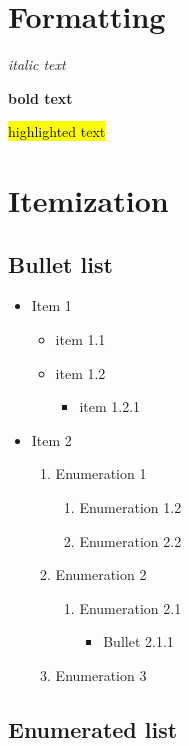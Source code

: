 \documentclass{doc_class_fontsize}{extarticle}
\begin{document}
\section{Formatting}




\textit{italic text}

\textbf{bold text}

\hl{highlighted text}





\section{Itemization}

\subsection{Bullet list}

\begin{itemize}
\item Item 1
\begin{itemize}
\item item 1.1
\item item 1.2
\begin{itemize}
\item item 1.2.1
\end{itemize}
\end{itemize}
\item Item 2
\begin{enumerate}
\item Enumeration 1
\begin{enumerate}
\item Enumeration 1.2
\item Enumeration 2.2
\end{enumerate}
\item Enumeration 2
\begin{enumerate}
\item Enumeration 2.1
\begin{itemize}
\item Bullet 2.1.1
\end{itemize}
\end{enumerate}
\item Enumeration 3
\end{enumerate}
\end{itemize}


\subsection{Enumerated list}
\end{document}
